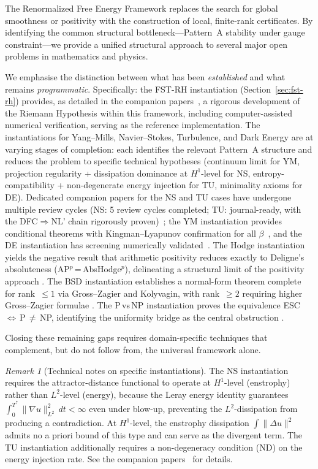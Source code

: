 \documentclass[12pt,a4paper]{article}
\theoremstyle{definition}
\theoremstyle{remark}
\newtheorem{remark}[theorem]{Remark}
\begin{document}
The Renormalized Free Energy Framework replaces the search for global smoothness or positivity with the construction of local, finite-rank certificates. By identifying the common structural bottleneck---Pattern~A stability under gauge constraint---we provide a unified structural approach to several major open problems in mathematics and physics.

We emphasise the distinction between what has been \emph{established} and what remains \emph{programmatic}. Specifically: the FST-RH instantiation (Section~\ref{sec:fst-rh}) provides, as detailed in the companion papers~\cite{Geiger2026a,Geiger2026b,Geiger2026c}, a rigorous development of the Riemann Hypothesis within this framework, including computer-assisted numerical verification, serving as the reference implementation. The instantiations for Yang--Mills, Navier--Stokes, Turbulence, and Dark Energy are at varying stages of completion: each identifies the relevant Pattern~A structure and reduces the problem to specific technical hypotheses (continuum limit for YM, projection regularity + dissipation dominance at $H^1$-level for NS, entropy-compatibility + non-degenerate energy injection for TU, minimality axioms for DE). Dedicated companion papers for the NS and TU cases have undergone multiple review cycles (NS: 5 review cycles completed; TU: journal-ready, with the DFC$\Rightarrow$NL' chain rigorously proven)~\cite{Geiger2026-NS,Geiger2026-TU}; the YM instantiation provides conditional theorems with Kingman--Lyapunov confirmation for all $\beta$~\cite{Geiger2026-YM}, and the DE instantiation has screening numerically validated~\cite{Geiger2026-DE}. The Hodge instantiation yields the negative result that arithmetic positivity reduces exactly to Deligne's absoluteness (AP$^p$\,=\,AbsHodge$^p$), delineating a structural limit of the positivity approach \cite{Geiger2026-Hodge}. The BSD instantiation establishes a normal-form theorem complete for rank~$\leq 1$ via Gross--Zagier and Kolyvagin, with rank~$\geq 2$ requiring higher Gross--Zagier formulae \cite{Geiger2026-BSD}. The P\,vs\,NP instantiation proves the equivalence ESC\,$\Leftrightarrow$\,P\,$\neq$\,NP, identifying the uniformity bridge as the central obstruction \cite{Geiger2026-PvsNP}.

Closing these remaining gaps requires domain-specific techniques that complement, but do not follow from, the universal framework alone.

\begin{remark}[Technical notes on specific instantiations]
\label{rem:technical-notes}
The NS instantiation requires the attractor-distance functional to operate at $H^1$-level (enstrophy) rather than $L^2$-level (energy), because the Leray energy identity guarantees $\int_0^{T^*}\|\nabla u\|_{L^2}^2\,dt < \infty$ even under blow-up, preventing the $L^2$-dissipation from producing a contradiction. At $H^1$-level, the enstrophy dissipation $\int\|\Delta u\|^2$ admits no a priori bound of this type and can serve as the divergent term. The TU instantiation additionally requires a non-degeneracy condition (ND) on the energy injection rate. See the companion papers~\cite{Geiger2026-NS,Geiger2026-TU} for details.
\end{remark}
\end{document}
